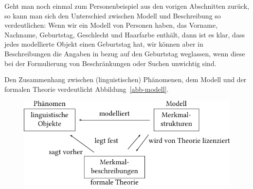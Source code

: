 Geht man noch einmal zum Personenbeispiel aus den vorigen Abschnitten zurück,
so kann man sich den Unterschied zwischen Modell und Beschreibung so verdeutlichen:
Wenn wir ein Modell von Personen haben, das Vorname, Nachname, Geburtstag,
Geschlecht und Haarfarbe enthält, dann ist es klar, dass jedes modellierte Objekt
einen Geburtstag hat, wir können aber in Beschreibungen die Angaben in bezug
auf den Geburtstag weglassen, wenn diese bei der Formulierung von Beschränkungen
oder Suchen unwichtig sind.

Den Zusammenhang zwischen (linguistischen) Phänomenen, dem Modell
und der formalen Theorie verdeutlicht Abbildung~\vref{abb-modell}.
\begin{figure}[htbp]
\centerline{%
\includegraphics{Figures/model-theory-phenomenon-crop}
}

\end{figure}
